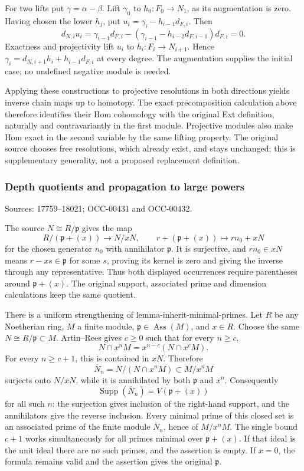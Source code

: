 For two lifts put \(\gamma=\alpha-\beta\). Lift \(\gamma_0\) to \(h_0:F_0\to N_1\), as its augmentation is zero. Having chosen the lower \(h_j\), put \(u_i=\gamma_i-h_{i-1}d_{F,i}\). Then \[
d_{N,i}u_i
=\gamma_{i-1}d_{F,i}
-(\gamma_{i-1}-h_{i-2}d_{F,i-1})d_{F,i}=0.
\] Exactness and projectivity lift \(u_i\) to \(h_i:F_i\to N_{i+1}\). Hence \(\gamma_i=d_{N,i+1}h_i+h_{i-1}d_{F,i}\) at every degree. The augmentation supplies the initial case; no undefined negative module is needed.

Applying these constructions to projective resolutions in both directions yields inverse chain maps up to homotopy. The exact precomposition calculation above therefore identifies their Hom cohomology with the original Ext definition, naturally and contravariantly in the first module. Projective modules also make Hom exact in the second variable by the same lifting property. The original source chooses free resolutions, which already exist, and stays unchanged; this is supplementary generality, not a proposed replacement definition.

\subsubsection{Depth quotients and propagation to large powers}\label{depth-quotients-and-propagation-to-large-powers}

Sources: 17759--18021; OCC-00431 and OCC-00432.

The source \(N\cong R/\mathfrak p\) gives the map \[
R/(\mathfrak p+(x))\longrightarrow N/xN,\qquad
r+(\mathfrak p+(x))\longmapsto r n_0+xN
\] for the chosen generator \(n_0\) with annihilator \(\mathfrak p\). It is surjective, and \(rn_0\in xN\) means \(r-xs\in\mathfrak p\) for some \(s\), proving its kernel is zero and giving the inverse through any representative. Thus both displayed occurrences require parentheses around \(\mathfrak p+(x)\). The original support, associated prime and dimension calculations keep the same quotient.

There is a uniform strengthening of lemma-inherit-minimal-primes. Let \(R\) be any Noetherian ring, \(M\) a finite module, \(\mathfrak p\in\operatorname{Ass}(M)\), and \(x\in R\). Choose the same \(N\cong R/\mathfrak p\subset M\). Artin--Rees gives \(c\geq0\) such that for every \(n\geq c\), \[
N\cap x^nM=x^{n-c}(N\cap x^cM).
\] For every \(n\geq c+1\), this is contained in \(xN\). Therefore \[
\overline N_n=N/(N\cap x^nM)\subset M/x^nM
\] surjects onto \(N/xN\), while it is annihilated by both \(\mathfrak p\) and \(x^n\). Consequently \[
\operatorname{Supp}(\overline N_n)=V(\mathfrak p+(x))
\] for all such \(n\): the surjection gives inclusion of the right-hand support, and the annihilators give the reverse inclusion. Every minimal prime of this closed set is an associated prime of the finite module \(\overline N_n\), hence of \(M/x^nM\). The single bound \(c+1\) works simultaneously for all primes minimal over \(\mathfrak p+(x)\). If that ideal is the unit ideal there are no such primes, and the assertion is empty. If \(x=0\), the formula remains valid and the assertion gives the original \(\mathfrak p\).

